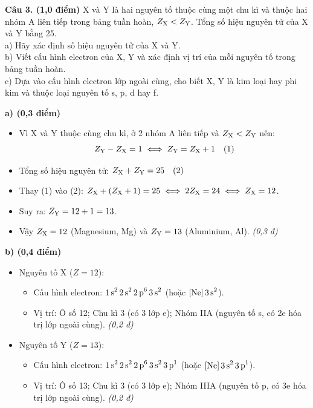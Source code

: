 \documentclass[11pt,a4paper]{article}
\begin{document}
\vspace{4pt}
\noindent
\textbf{Câu 3. (1,0 điểm)} X và Y là hai nguyên tố thuộc cùng một chu kì và thuộc hai nhóm A liên tiếp trong bảng tuần hoàn, $Z_{\ce{X}} < Z_{\ce{Y}}$. Tổng số hiệu nguyên tử của X và Y bằng 25.\\
a) Hãy xác định số hiệu nguyên tử của X và Y.\\
b) Viết cấu hình electron của X, Y và xác định vị trí của mỗi nguyên tố trong bảng tuần hoàn.\\
c) Dựa vào cấu hình electron lớp ngoài cùng, cho biết X, Y là kim loại hay phi kim và thuộc loại nguyên tố s, p, d hay f.

\begin{tcolorbox}[colback=white,colframe=solBlue,title=\textbf{Hướng dẫn giải chi tiết Câu 3 (1,0 điểm):}]
\textbf{a) (0,3 điểm)}
\begin{itemize}[leftmargin=1.0cm]
\item Vì X và Y thuộc cùng chu kì, ở 2 nhóm A liên tiếp và $Z_{\ce{X}} < Z_{\ce{Y}}$ nên:
$$Z_{\ce{Y}} - Z_{\ce{X}} = 1 \iff Z_{\ce{Y}} = Z_{\ce{X}} + 1 \quad (1)$$
\item Tổng số hiệu nguyên tử: $Z_{\ce{X}} + Z_{\ce{Y}} = 25 \quad (2)$
\item Thay (1) vào (2): $Z_{\ce{X}} + (Z_{\ce{X}} + 1) = 25 \iff 2Z_{\ce{X}} = 24 \iff Z_{\ce{X}} = 12$.
\item Suy ra: $Z_{\ce{Y}} = 12 + 1 = 13$.
\item Vậy $Z_{\ce{X}} = 12$ (Magnesium, Mg) và $Z_{\ce{Y}} = 13$ (Aluminium, Al). \hfill \textit{(0,3 đ)}
\end{itemize}
\textbf{b) (0,4 điểm)}
\begin{itemize}[leftmargin=1.0cm]
\item Nguyên tố X ($Z = 12$):
  \begin{itemize}
    \item Cấu hình electron: $\ce{1s^2 2s^2 2p^6 3s^2}$ (hoặc $\ce{[Ne] 3s^2}$).
    \item Vị trí: Ô số 12; Chu kì 3 (có 3 lớp e); Nhóm IIA (nguyên tố s, có 2e hóa trị lớp ngoài cùng). \hfill \textit{(0,2 đ)}
  \end{itemize}
\item Nguyên tố Y ($Z = 13$):
  \begin{itemize}
    \item Cấu hình electron: $\ce{1s^2 2s^2 2p^6 3s^2 3p^1}$ (hoặc $\ce{[Ne] 3s^2 3p^1}$).
    \item Vị trí: Ô số 13; Chu kì 3 (có 3 lớp e); Nhóm IIIA (nguyên tố p, có 3e hóa trị lớp ngoài cùng). \hfill \textit{(0,2 đ)}

\end{itemize}
\end{itemize}
\end{tcolorbox}
\end{document}
